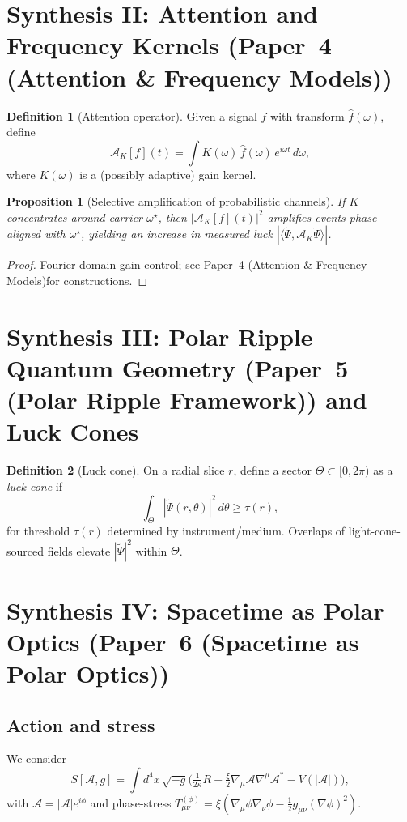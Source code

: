 \documentclass[12pt]{article}
\newcommand{\Afield}{\mathcal{A}}    %
\newcommand{\phiang}{\phi}           %
\newcommand{\Psit}{\tilde{\Psi}}     %
\newcommand{\PaperIV}{Paper~4 (Attention \& Frequency Models)}
\newcommand{\PaperV}{Paper~5 (Polar Ripple Framework)}
\newcommand{\PaperVI}{Paper~6 (Spacetime as Polar Optics)}
\theoremstyle{plain}
\newtheorem{proposition}{Proposition}
\theoremstyle{definition}
\newtheorem{definition}{Definition}
\theoremstyle{remark}
\begin{document}
\section{Synthesis II: Attention and Frequency Kernels \texorpdfstring{(\PaperIV)}{}}
\begin{definition}[Attention operator]
Given a signal \(f\) with transform \(\hat f(\omega)\), define
\[
\mathcal{A}_K[f](t)=\int K(\omega)\,\hat f(\omega)\,e^{i\omega t}\,d\omega,
\]
where \(K(\omega)\) is a (possibly adaptive) gain kernel.
\end{definition}
\begin{proposition}[Selective amplification of probabilistic channels]
If \(K\) concentrates around carrier \(\omega^\star\), then \(|\mathcal{A}_K[f](t)|^2\) amplifies events phase-aligned with \(\omega^\star\), yielding an increase in measured luck \(|\langle \Psit,\mathcal{A}_K\Psit\rangle|\).
\end{proposition}
\begin{proof}
Fourier-domain gain control; see \PaperIV for constructions.
\end{proof}

\section{Synthesis III: Polar Ripple Quantum Geometry \texorpdfstring{(\PaperV)}{} and Luck Cones}
\begin{definition}[Luck cone]
On a radial slice \(r\), define a sector \(\Theta\subset[0,2\pi)\) as a \emph{luck cone} if
\[
\int_{\Theta} |\Psit(r,\theta)|^2\,d\theta \ge \tau(r),
\]
for threshold \(\tau(r)\) determined by instrument/medium. Overlaps of light-cone-sourced fields elevate \(|\Psit|^2\) within \(\Theta\).
\end{definition}

\section{Synthesis IV: Spacetime as Polar Optics \texorpdfstring{(\PaperVI)}{}}
\subsection{Action and stress}
We consider
\[
S[\Afield,g]=\int d^4x\,\sqrt{-g}\Big(\tfrac{1}{2\kappa}R+\tfrac{\xi}{2}\nabla_\mu \Afield \nabla^\mu \Afield^* - V(|\Afield|)\Big),
\]
with \(\Afield=|\Afield|e^{i\phiang}\) and phase-stress \(T^{(\phi)}_{\mu\nu}=\xi(\nabla_\mu \phiang \nabla_\nu \phiang - \tfrac12 g_{\mu\nu}(\nabla \phiang)^2)\).
\end{document}
